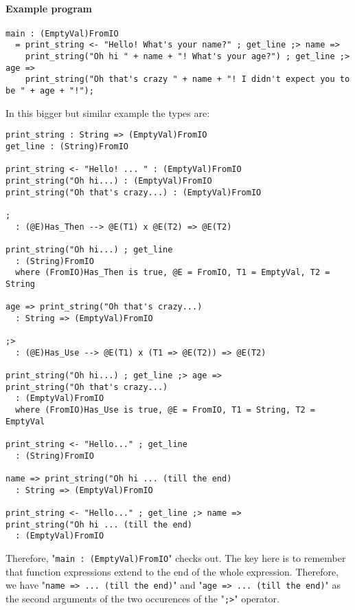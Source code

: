 \documentclass{article}
\begin{document}
\paragraph{Example program}
\begin{verbatim}
main : (EmptyVal)FromIO
  = print_string <- "Hello! What's your name?" ; get_line ;> name =>
    print_string("Oh hi " + name + "! What's your age?") ; get_line ;> age =>
    print_string("Oh that's crazy " + name + "! I didn't expect you to be " + age + "!");
\end{verbatim}
In this bigger but similar example the types are:
\begin{verbatim}
print_string : String => (EmptyVal)FromIO
get_line : (String)FromIO

print_string <- "Hello! ... " : (EmptyVal)FromIO
print_string("Oh hi...) : (EmptyVal)FromIO
print_string("Oh that's crazy...) : (EmptyVal)FromIO

;
  : (@E)Has_Then --> @E(T1) x @E(T2) => @E(T2) 

print_string("Oh hi...) ; get_line
  : (String)FromIO
  where (FromIO)Has_Then is true, @E = FromIO, T1 = EmptyVal, T2 = String

age => print_string("Oh that's crazy...)
  : String => (EmptyVal)FromIO

;>
  : (@E)Has_Use --> @E(T1) x (T1 => @E(T2)) => @E(T2) 

print_string("Oh hi...) ; get_line ;> age =>
print_string("Oh that's crazy...)
  : (EmptyVal)FromIO
  where (FromIO)Has_Use is true, @E = FromIO, T1 = String, T2 = EmptyVal

print_string <- "Hello..." ; get_line
  : (String)FromIO

name => print_string("Oh hi ... (till the end)
  : String => (EmptyVal)FromIO

print_string <- "Hello..." ; get_line ;> name =>
print_string("Oh hi ... (till the end)
  : (EmptyVal)FromIO
\end{verbatim}
Therefore, "\texttt{main\ :\ (EmptyVal)FromIO}" checks out.  The key here is
to remember that function expressions extend to the end of the whole
expression. Therefore, we have "\texttt{name => ... (till the end)}" and
"\texttt{age => ... (till the end)}" as the second arguments of the two
occurences of the "\texttt{;>}" operator. 
\end{document}
